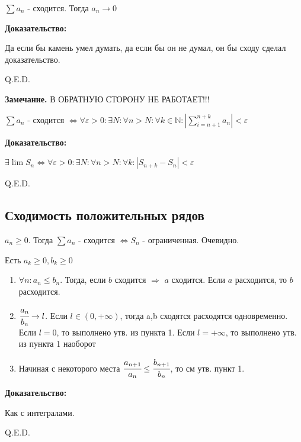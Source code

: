 
$\sum a_n$ - сходится. Тогда $a_n \rightarrow 0$

\textbf{Доказательство:}

Да если бы камень умел думать, да если бы он не думал, он бы сходу сделал доказательство.

\hfill Q.E.D.

\textbf{Замечание.} В ОБРАТНУЮ СТОРОНУ НЕ РАБОТАЕТ!!!


$\sum a_n$ - сходится $\Leftrightarrow \forall \varepsilon>0: \exists N:\forall n > N: \forall k \in \mathbb{N}: |\sum\limits_{i=n+1}^{n+k}a_n|<\varepsilon$

\textbf{Доказательство:}

$\exists \lim S_n \Leftrightarrow \forall \varepsilon > 0: \exists N: \forall n > N: \forall k: |S_{n+k}-S_n|<\varepsilon$

\hfill Q.E.D.

\pagebreak

\subsection{Сходимость положительных рядов}

 $a_n \geq 0 $. Тогда $\sum a_n$ - сходится $\Leftrightarrow S_n$ - ограниченная. Очевидно.


Есть $a_k \geq 0 , b_k \geq 0$

\begin{enumerate}
    \item  $\forall n: a_n \leq b_n$. Тогда, если $b$ сходится $\Rightarrow$  $a$ сходится. Если $a$ расходится, то $b$ расходится.
    \item $\cfrac{a_n}{b_n}\rightarrow l$. Если $ l \in (0,+\infty)$, тогда a,b сходятся расходятся одновременно. Если $l = 0$, то выполнено утв. из пункта 1. Если $l=+\infty$, то выполнено утв. из пункта 1 наоборот
    \item Начиная с некоторого места $\cfrac{a_{n+1}}{a_n}\leq \cfrac{b_{n+1}}{b_n}$, то см утв. пункт 1.
\end{enumerate}

\textbf{Доказательство:}

Как с интегралами.

\hfill Q.E.D.

